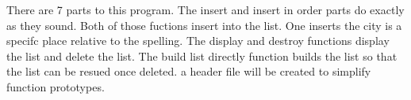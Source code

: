 There are 7 parts to this program. The insert and insert in order parts do exactly as they sound. Both of those fuctions insert into the list. One inserts the city is a specifc place relative to the spelling. The display and destroy functions display the list and delete the list. The build list directly function builds the list so that the list can be resued once deleted. a header file will be created to simplify function prototypes. 